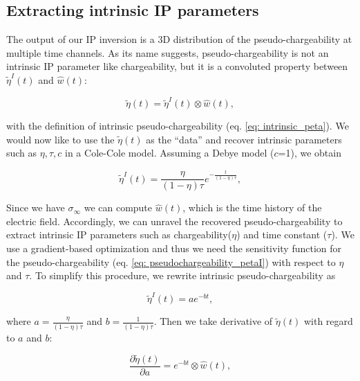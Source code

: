 \documentclass[extra,mreferee]{gji}
\newcommand{\siginf}{\sigma_\infty}
\newcommand{\peta}{\tilde{\eta}}
\begin{document}
\subsection{Extracting intrinsic IP parameters}
\label{section: extract_intrinsicIP}
The output of our IP inversion is a 3D distribution of the pseudo-chargeability at multiple time channels. 
As its name suggests, pseudo-chargeability is not an intrinsic IP parameter like chargeability, but it is a convoluted property between $\peta^{I}(t)$ and $\hat{w}(t)$:
\begin{linenomath*}
\begin{equation}
  \peta(t) = \peta^{I}(t) \otimes \hat{w}(t),
  \label{eq: pseudochargeability_petaI}
\end{equation}
\end{linenomath*}
with the definition of intrinsic pseudo-chargeability (eq. \ref{eq: intrinsic_peta}).
We would now like to use the $\peta(t)$ as the “data” and recover intrinsic parameters such as $\eta, \tau, c$ in a Cole-Cole model. Assuming a Debye model ($c$=1), we obtain
\begin{linenomath*}
\begin{equation}
    \peta^{I}(t) = \frac{\eta}{(1-\eta)\tau}e^{-\frac{t}{(1-\eta)\tau}},
    \label{eq: intrinsic_peta_debye}
\end{equation}
\end{linenomath*}
Since we have $\siginf$ we can compute $\hat{w}(t)$, which is the time history of the electric field. 
Accordingly, we can unravel the recovered pseudo-chargeability to extract intrinsic IP parameters such as chargeability($\eta$) and time constant ($\tau$). 
We use a gradient-based optimization and thus we need the sensitivity function for the pseudo-chargeability (eq. \ref{eq: pseudochargeability_petaI}) with respect to $\eta$ and $\tau$. 
To simplify this procedure, we rewrite intrinsic pseudo-chargeability as 
\begin{linenomath*}
\begin{equation}
  \peta^{I}(t) = a e^{-bt},
\end{equation}
\end{linenomath*}
where $a = \frac{\eta}{(1-\eta)\tau}$ and $b = \frac{1}{(1-\eta)\tau}$. 
Then we take derivative of $\peta(t)$ with regard to $a$ and $b$:
\begin{linenomath*}
\begin{equation}
  \frac{\partial \peta(t)}{\partial a} = e^{-bt} \otimes \hat{w}(t),
\end{equation}
\end{linenomath*}
\end{document}
